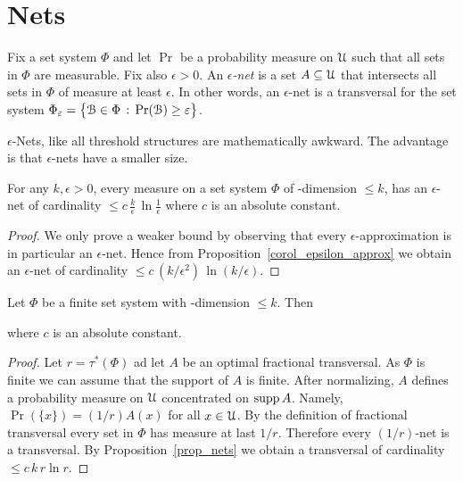 \documentclass[sputnik.tex]{subfiles}
\begin{document}
\section{Nets}

Fix a set system $\Phi$ and let $\Pr$ be a probability measure on $\EuScript U$ such that all sets in $\Phi$ are measurable.
Fix also $\epsilon>0$.
An \emph{$\epsilon$-net\/} is a set $A\subseteq\EuScript U$ that intersects all sets in $\Phi$ of measure at least $\epsilon$.
In other words, an $\epsilon$-net is a transversal for the set system $\Phi_\varepsilon=\big\{\EuScript B\in\Phi\,:\,\Pr(\EuScript B)\ge\varepsilon\big\}$.

$\epsilon$-Nets, like all threshold structures are mathematically awkward. The advantage is that $\epsilon$-nets have a smaller size. 

\begin{proposition}\label{prop_nets}
For any $k,\epsilon>0$, every measure on a set system $\Phi$ of \vc-dimension $\le k$, has an $\epsilon$-net of cardinality $\displaystyle\le c\,\frac k\epsilon\,\ln \frac1\epsilon$ where $c$ is an absolute constant.
\end{proposition}

\begin{proof}
We only prove a weaker bound by observing that every $\epsilon$-approximation is in particular an $\epsilon$-net. Hence from Proposition~\ref{corol_epsilon_approx} we obtain an $\epsilon$-net of cardinality $\displaystyle\le c\,(k/\epsilon^2)\,\ln(k/\epsilon)$.
\end{proof}

\begin{proposition}\label{prop_bound_fractional_trans}
Let $\Phi$ be a finite set system with \vc-dimension $\le k$. Then 


where $c$ is an absolute constant.
\end{proposition}

\begin{proof}
Let $r=\tau^*(\Phi)$ ad let $A$ be an optimal fractional transversal.
As $\Phi$ is finite we can assume that the support of $A$ is finite.
After normalizing, $A$ defines a probability measure on $\EuScript U$ concentrated on $\mathop{\rm supp} A$.
Namely, $\Pr(\{x\})=(1/r)A(x)$ for all $x\in\EuScript U$.
By the definition of fractional transversal every set in $\Phi$ has measure at last $1/r$.
Therefore every $(1/r)$-net is a transversal.
By Proposition~\ref{prop_nets} we obtain a transversal of cardinality $\le c\,k\, r \ln r$.
\end{proof}
\end{document}
